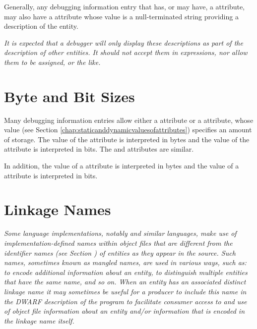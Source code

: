 Generally, any debugging information
entry that 
\hypertarget{chap:DWATdescriptionartificialnameordescription}{}
has, or may have, 
a 
\DWATname{} attribute, may
also have 
a 
\DWATdescription{} attribute whose value is a
null-terminated string providing a description of the entity.


\textit{It is expected that a debugger will only display these
descriptions as part of the description of other entities. It
should not accept them in expressions, nor allow them to be
assigned, or the like.}

\section{Byte and Bit Sizes}
\label{chap:byteandbitsizes}
Many debugging information entries allow either a
\DWATbytesize{} attribute or a 
\DWATbitsize{} attribute,
whose  value 
(see Section \ref{chap:staticanddynamicvaluesofattributes}) 
specifies an
amount of storage. The value of the 
\DWATbytesize{} attribute
is interpreted in bytes and the value of the 
\DWATbitsize{}
attribute is interpreted in bits. The
\DWATstringlengthbytesize{} and 
\DWATstringlengthbitsize{} 
attributes are similar.

In addition, the 
value of a \DWATbytestride{} attribute is interpreted
in bytes and the  value of a 
\DWATbitstride{}
attribute is interpreted in bits.

\section{Linkage Names}
\label{chap:linkagenames}
\textit{Some language implementations, notably 
 and similar
languages, 
make use of implementation-defined names within
object files that are different from the identifier names
(see Section ) of entities as they appear in the
source. Such names, sometimes known 
as 
mangled names,
are used in various ways, such as: to encode additional
information about an entity, to distinguish multiple entities
that have the same name, and so on. When an entity has an
associated distinct linkage name it may sometimes be useful
for a producer to include this name in the DWARF description
of the program to facilitate consumer access to and use of
object file information about an entity and/or information
\hypertarget{chap:DWATlinkagenameobjectfilelinkagenameofanentity}{}
that is encoded in the linkage name itself.  
}

